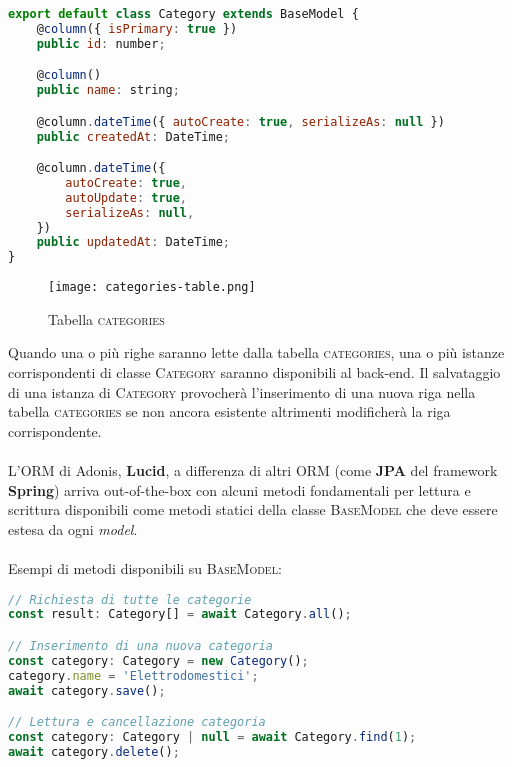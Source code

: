 \begin{lstlisting}[language=JavaScript]
export default class Category extends BaseModel {
    @column({ isPrimary: true })
    public id: number;

    @column()
    public name: string;

    @column.dateTime({ autoCreate: true, serializeAs: null })
    public createdAt: DateTime;

    @column.dateTime({
        autoCreate: true,
        autoUpdate: true,
        serializeAs: null,
    })
    public updatedAt: DateTime;
}
\end{lstlisting}

\begin{figure}[h!]
    \centering
    \texttt{[image: categories-table.png]}
    \caption{Tabella \textsc{categories}}
\end{figure}

Quando una o più righe saranno lette dalla tabella \textsc{categories}, una o più istanze corrispondenti di classe \textsc{Category} saranno disponibili al back-end. Il salvataggio di una istanza di \textsc{Category} provocherà l'inserimento di una nuova riga nella tabella \textsc{categories} se non ancora esistente altrimenti modificherà la riga corrispondente.
\\\\
L'ORM di Adonis, \textbf{Lucid}, a differenza di altri ORM (come \textbf{JPA} del framework \textbf{Spring}) arriva out-of-the-box con alcuni metodi fondamentali per lettura e scrittura disponibili come metodi statici della classe \textsc{BaseModel} che deve essere estesa da ogni \textit{model}.
\\\\
Esempi di metodi disponibili su \textsc{BaseModel}:

\begin{lstlisting}[language=JavaScript]
// Richiesta di tutte le categorie
const result: Category[] = await Category.all();

// Inserimento di una nuova categoria
const category: Category = new Category();
category.name = 'Elettrodomestici';
await category.save();

// Lettura e cancellazione categoria
const category: Category | null = await Category.find(1);
await category.delete();
\end{lstlisting}

